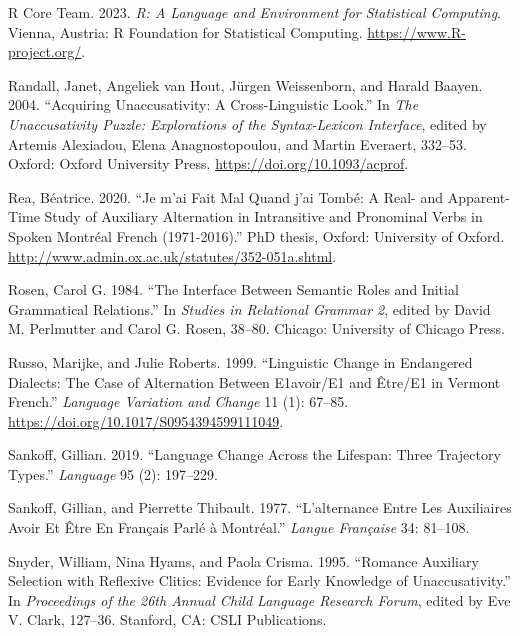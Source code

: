 \documentclass[
  12pt,
]{article}
\newlength{\cslhangindent}
\newlength{\cslentryspacingunit} %
\newenvironment{CSLReferences}[2] %
 {%
  \setlength{\parindent}{0pt}
  \ifodd #1
  \let\oldpar\par
  \def\par{\hangindent=\cslhangindent\oldpar}
  \fi
  \setlength{\parskip}{#2\cslentryspacingunit}
 }%
 {}
\begin{document}
\begin{enumerate}[resume*]
\begin{enumerate}[resume*]
\begin{enumerate}[resume*]
\begin{enumerate}[resume*]
\begin{enumerate}[resume*]
\begin{CSLReferences}{1}{0}
\leavevmode{}%
R Core Team. 2023. \emph{R: {A} {Language} and {Environment} for {Statistical} {Computing}}. Vienna, Austria: R Foundation for Statistical Computing. \url{https://www.R-project.org/}.

\leavevmode{}%
Randall, Janet, Angeliek van Hout, Jürgen Weissenborn, and Harald Baayen. 2004. {``Acquiring Unaccusativity: {A} Cross-Linguistic Look.''} In \emph{The {Unaccusativity} {Puzzle}: {Explorations} of the {Syntax}-{Lexicon} {Interface}}, edited by Artemis Alexiadou, Elena Anagnostopoulou, and Martin Everaert, 332--53. Oxford: Oxford University Press. \url{https://doi.org/10.1093/acprof}.

\leavevmode{}%
Rea, Béatrice. 2020. {``Je m'ai Fait Mal Quand j'ai Tombé: {A} Real- and Apparent-Time Study of Auxiliary Alternation in Intransitive and Pronominal Verbs in Spoken {Montréal} {French} (1971-2016).''} PhD thesis, Oxford: University of Oxford. \url{http://www.admin.ox.ac.uk/statutes/352-051a.shtml}.

\leavevmode{}%
Rosen, Carol G. 1984. {``The Interface Between Semantic Roles and Initial Grammatical Relations.''} In \emph{Studies in {Relational} {Grammar} 2}, edited by David M. Perlmutter and Carol G. Rosen, 38--80. Chicago: University of Chicago Press.

\leavevmode{}%
Russo, Marijke, and Julie Roberts. 1999. {``Linguistic Change in Endangered Dialects: {The} Case of Alternation Between E1avoir/E1 and Être/E1 in {Vermont} {French}.''} \emph{Language Variation and Change} 11 (1): 67--85. \url{https://doi.org/10.1017/S0954394599111049}.

\leavevmode{}%
Sankoff, Gillian. 2019. {``Language Change Across the Lifespan: {Three} Trajectory Types.''} \emph{Language} 95 (2): 197--229.

\leavevmode{}%
Sankoff, Gillian, and Pierrette Thibault. 1977. {``L'alternance Entre Les Auxiliaires Avoir Et Être En Français Parlé à {Montréal}.''} \emph{Langue Française} 34: 81--108.

\leavevmode{}%
Snyder, William, Nina Hyams, and Paola Crisma. 1995. {``Romance Auxiliary Selection with Reflexive Clitics: {Evidence} for Early Knowledge of Unaccusativity.''} In \emph{Proceedings of the 26th {Annual} {Child} {Language} {Research} {Forum}}, edited by Eve V. Clark, 127--36. Stanford, CA: CSLI Publications.


\end{CSLReferences}
\end{enumerate}
\end{enumerate}
\end{enumerate}
\end{enumerate}
\end{enumerate}
\end{document}
